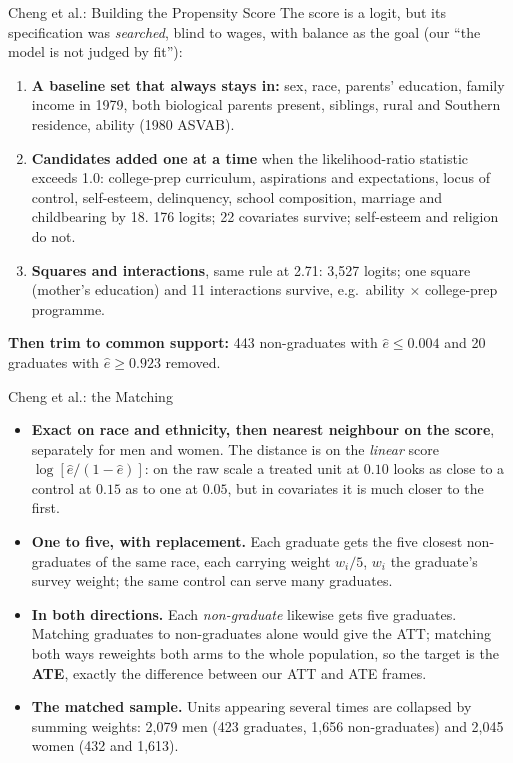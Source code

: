 \documentclass[aspectratio=169,11pt,xcolor=dvipsnames]{beamer}
\begin{document}
\begin{frame}{Cheng et al.: Building the Propensity Score}
The score is a logit, but its specification was \emph{searched}, blind to
wages, with balance as the goal (our ``the model is not judged by fit''):
\begin{enumerate}\itemsep2pt
  \item \textbf{A baseline set that always stays in:} sex, race, parents'
        education, family income in 1979, both biological parents present,
        siblings, rural and Southern residence, ability (1980 ASVAB).
  \item \textbf{Candidates added one at a time} when the likelihood-ratio
        statistic exceeds 1.0: college-prep curriculum, aspirations and
        expectations, locus of control, self-esteem, delinquency, school
        composition, marriage and childbearing by 18. 176 logits; 22
        covariates survive; self-esteem and religion do not.
  \item \textbf{Squares and interactions}, same rule at 2.71: 3,527 logits;
        one square (mother's education) and 11 interactions survive, e.g.\
        ability $\times$ college-prep programme.
\end{enumerate}
\vskip2pt
\textbf{Then trim to common support:} 443 non-graduates with
$\hat e \le 0.004$ and 20 graduates with $\hat e \ge 0.923$ removed.
\end{frame}

\begin{frame}{Cheng et al.: the Matching}
\begin{itemize}\itemsep3pt
  \item \textbf{Exact on race and ethnicity, then nearest neighbour on the
        score}, separately for men and women. The distance is on the
        \emph{linear} score $\log[\hat e/(1-\hat e)]$: on the raw scale a
        treated unit at $0.10$ looks as close to a control at $0.15$ as to
        one at $0.05$, but in covariates it is much closer to the first.
  \item \textbf{One to five, with replacement.} Each graduate gets the five
        closest non-graduates of the same race, each carrying weight
        $w_i/5$, $w_i$ the graduate's survey weight; the same control can
        serve many graduates.
  \item \textbf{In both directions.} Each \emph{non-graduate} likewise gets
        five graduates. Matching graduates to non-graduates alone would give
        the ATT; matching both ways reweights both arms to the whole
        population, so the target is the \textbf{ATE}, exactly the difference
        between our ATT and ATE frames.
  \item \textbf{The matched sample.} Units appearing several times are
        collapsed by summing weights: 2,079 men (423 graduates, 1,656
        non-graduates) and 2,045 women (432 and 1,613).
\end{itemize}
\end{frame}
\end{document}
